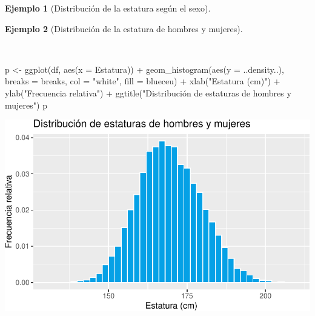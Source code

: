 \documentclass[
  a4paper,
]{scrreport}
\newenvironment{Shaded}{\begin{snugshade}}{\end{snugshade}}
\newcommand{\AttributeTok}[1]{\textcolor[rgb]{0.40,0.45,0.13}{#1}}
\newcommand{\FunctionTok}[1]{\textcolor[rgb]{0.28,0.35,0.67}{#1}}
\newcommand{\NormalTok}[1]{\textcolor[rgb]{0.00,0.23,0.31}{#1}}
\newcommand{\OtherTok}[1]{\textcolor[rgb]{0.00,0.23,0.31}{#1}}
\newcommand{\SpecialCharTok}[1]{\textcolor[rgb]{0.37,0.37,0.37}{#1}}
\newcommand{\StringTok}[1]{\textcolor[rgb]{0.13,0.47,0.30}{#1}}
\theoremstyle{plain}
\theoremstyle{definition}
\theoremstyle{definition}
\newtheorem{example}{Ejemplo}[chapter]
\theoremstyle{remark}
\begin{document}
\begin{example}[Distribución de la estatura según el
sexo]
\end{example}

\begin{example}[Distribución de la estatura de hombres y
mujeres]\protect\hypertarget{exm-distribucion-estaturas-ambos-sexos}{}\label{exm-distribucion-estaturas-ambos-sexos}

~

\begin{Shaded}
\begin{Highlighting}[]
\NormalTok{p }\OtherTok{\textless{}{-}} \FunctionTok{ggplot}\NormalTok{(df, }\FunctionTok{aes}\NormalTok{(}\AttributeTok{x =}\NormalTok{ Estatura)) }\SpecialCharTok{+}
    \FunctionTok{geom\_histogram}\NormalTok{(}\FunctionTok{aes}\NormalTok{(}\AttributeTok{y =}\NormalTok{ ..density..), }\AttributeTok{breaks =}\NormalTok{ breaks, }\AttributeTok{col =} \StringTok{"white"}\NormalTok{, }\AttributeTok{fill =}\NormalTok{ blueceu) }\SpecialCharTok{+}
    \FunctionTok{xlab}\NormalTok{(}\StringTok{"Estatura (cm)"}\NormalTok{) }\SpecialCharTok{+}
    \FunctionTok{ylab}\NormalTok{(}\StringTok{"Frecuencia relativa"}\NormalTok{) }\SpecialCharTok{+}
    \FunctionTok{ggtitle}\NormalTok{(}\StringTok{"Distribución de estaturas de hombres y mujeres"}\NormalTok{)}
\NormalTok{p}
\end{Highlighting}
\end{Shaded}

\includegraphics{02-estadistica-descriptiva_files/figure-pdf/histograma-estatura-ambos-sexo-1.pdf}

\end{example}
\end{document}
